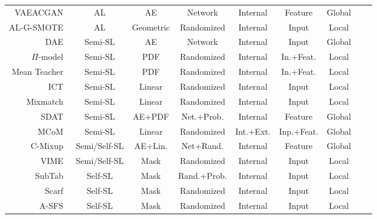 \documentclass[parskip=full]{scrartcl}
\begin{document}
\begin{longtable}{rcccccccc}
    VAEACGAN~\cite{tran2019bayesian} & AL & AE & Network & Internal & Feature & Global\\
    AL-G-SMOTE~\cite{fonseca2021increasing} & AL & Geometric & Randomized & Internal & Input & Local\\
    DAE~\cite{rasmus2015semi} & Semi-SL & AE & Network & Internal & Input & Global \\ 
    $\Pi$-model~\cite{samuli2017temporal} & Semi-SL & PDF & Randomized & Internal & In.+Feat. & Local \\
    Mean Teacher~\cite{tarvainen2017mean} & Semi-SL & PDF & Randomized & Internal & In.+Feat. & Local \\
    ICT~\cite{verma2022interpolation} & Semi-SL & Linear & Randomized & Internal & Input & Local \\
    Mixmatch~\cite{berthelot2019mixmatch} & Semi-SL & Linear & Randomized & Internal & Input & Local \\
    SDAT~\cite{fang2022semi} & Semi-SL & AE+PDF & Net.+Prob. & Internal & Feature & Global \\
    MCoM~\cite{li2022mcom} & Semi-SL & Linear & Randomized & Int.+Ext. & Inp.+Feat. & Global \\
    C-Mixup~\cite{darabi2021contrastive} & Semi/Self-SL & AE+Lin. & Net+Rand.  & Internal & Feature & Global \\
    VIME~\cite{yoon2020vime} & Semi/Self-SL & Mask & Randomized & Internal & Input & Local \\
    SubTab~\cite{ucar2021subtab} & Self-SL & Mask & Rand.+Prob. & Internal & Input & Local \\
    Scarf~\cite{bahri2022scarf} & Self-SL & Mask & Randomized & Internal & Input & Local \\
    A-SFS~\cite{qiu2022sfs} & Self-SL & Mask & Randomized & Internal & Input & Local \\
\end{longtable}
\endgroup


% 
% 
% 
\end{document}
